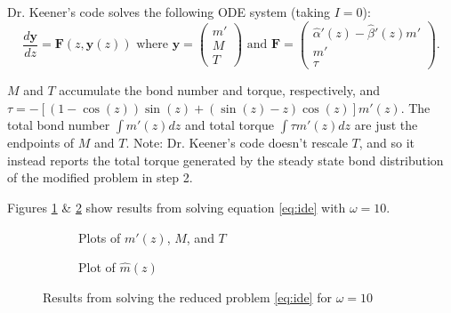 \documentclass{article}
\begin{document}
Dr. Keener's code solves the following ODE system (taking $I = 0$):
\begin{equation}
  \frac{d\mathbf{y}}{dz} = \mathbf{F}(z, \mathbf{y}(z)) \text{ where }
  \mathbf{y} = \begin{pmatrix} m' \\ M \\ T \end{pmatrix} \text{ and }
  \mathbf{F} = \begin{pmatrix} \hat{\alpha}'(z) - \hat{\beta}'(z) m'
    \\ m' \\ \tau \end{pmatrix}.
\end{equation}

$M$ and $T$ accumulate the bond number and torque, respectively, and
$\tau = -[(1 - \cos(z))\sin(z) + (\sin(z) - z)\cos(z)]m'(z)$. The
total bond number $\int m'(z) dz$ and total torque $\int \tau m'(z)
dz$ are just the endpoints of $M$ and $T$. Note: Dr. Keener's code
doesn't rescale $T$, and so it instead reports the total torque
generated by the steady state bond distribution of the modified
problem in step 2.

Figures \ref{fig:unscaled} \& \ref{fig:scaled} show results from
solving equation \eqref{eq:ide} with $\omega = 10$.

\begin{figure}
  \centering
  \begin{subfigure}{0.48\linewidth}
    \caption{Plots of $m'(z)$, $M$, and $T$}
    \label{fig:unscaled}
  \end{subfigure}
  \hfill
  \begin{subfigure}{0.48\linewidth}
    \caption{Plot of $\hat{m}(z)$}
    \label{fig:scaled}
  \end{subfigure}
  \caption{Results from solving the reduced problem \eqref{eq:ide} for
  $\omega = 10$}
  \label{fig:reduced-prob}
\end{figure}
\end{document}
